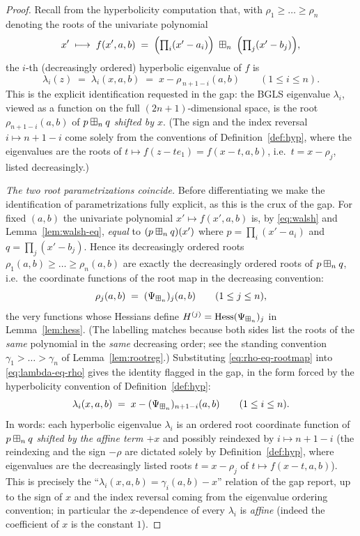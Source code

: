 \begin{proof}
Recall from the hyperbolicity computation that, with $\rho_1\ge\dots\ge\rho_n$
denoting the roots of the univariate polynomial
\[
x'\;\longmapsto\;f(x',a,b)\;=\;\Bigl(\textstyle\prod_i(x'-a_i)\Bigr)\;\boxplus_n\;
\Bigl(\textstyle\prod_j(x'-b_j)\Bigr),
\]
the $i$-th (decreasingly ordered) hyperbolic eigenvalue of $f$ is
\begin{equation}\label{eq:lambda-eq-rho}
\lambda_i(z)\;=\;\lambda_i(x,a,b)\;=\;x-\rho_{\,n+1-i}(a,b)\qquad(1\le i\le n).
\end{equation}
This is the explicit identification requested in the gap: the BGLS eigenvalue
$\lambda_i$, viewed as a function on the full $(2n{+}1)$-dimensional space, is
the root $\rho_{n+1-i}(a,b)$ of $p\boxplus_n q$ \emph{shifted by $x$}. (The sign
and the index reversal $i\mapsto n+1-i$ come solely from the conventions of
Definition~\ref{def:hyp}, where the eigenvalues are the roots of
$t\mapsto f(z-te_1)=f(x-t,a,b)$, i.e.\ $t=x-\rho_j$, listed decreasingly.)

\smallskip\noindent\emph{The two root parametrizations coincide.}
Before differentiating we make the identification of parametrizations fully
explicit, as this is the crux of the gap. For fixed $(a,b)$ the univariate
polynomial $x'\mapsto f(x',a,b)$ is, by \eqref{eq:walsh} and
Lemma~\ref{lem:walsh-eq}, \emph{equal} to $(p\boxplus_n q)(x')$ where
$p=\prod_i(x'-a_i)$ and $q=\prod_j(x'-b_j)$. Hence its decreasingly ordered
roots $\rho_1(a,b)\ge\dots\ge\rho_n(a,b)$ are exactly the decreasingly ordered
roots of $p\boxplus_n q$, i.e.\ the coordinate functions of the root map in the
decreasing convention:
\begin{equation}\label{eq:rho-eq-rootmap}
\rho_j(a,b)\;=\;(\Psi_{\boxplus_n})_j(a,b)\qquad(1\le j\le n),
\end{equation}
the very functions whose Hessians define $H^{(j)}=\operatorname{Hess}(\Psi_{\boxplus_n})_j$ in
Lemma~\ref{lem:hess}. (The labelling matches because both sides list the roots of
the \emph{same} polynomial in the \emph{same} decreasing order; see the standing
convention $\gamma_1>\dots>\gamma_n$ of Lemma~\ref{lem:rootreg}.) Substituting
\eqref{eq:rho-eq-rootmap} into \eqref{eq:lambda-eq-rho} gives the identity
flagged in the gap, in the form forced by the hyperbolicity convention of
Definition~\ref{def:hyp}:
\begin{equation}\label{eq:lambda-eq-rootmap}
\lambda_i(x,a,b)\;=\;x-(\Psi_{\boxplus_n})_{n+1-i}(a,b)\qquad(1\le i\le n).
\end{equation}
In words: each hyperbolic eigenvalue $\lambda_i$ is an ordered root coordinate
function of $p\boxplus_n q$ \emph{shifted by the affine term $+x$} and possibly
reindexed by $i\mapsto n+1-i$ (the reindexing and the sign $-\rho$ are dictated
solely by Definition~\ref{def:hyp}, where eigenvalues are the decreasingly
listed roots $t=x-\rho_j$ of $t\mapsto f(x-t,a,b)$). This is precisely the
``$\lambda_i(x,a,b)=\gamma_i(a,b)-x$'' relation of the gap report, up to the sign
of $x$ and the index reversal coming from the eigenvalue ordering convention; in
particular the $x$-dependence of every $\lambda_i$ is \emph{affine} (indeed the
coefficient of $x$ is the constant $1$).


\end{proof}
